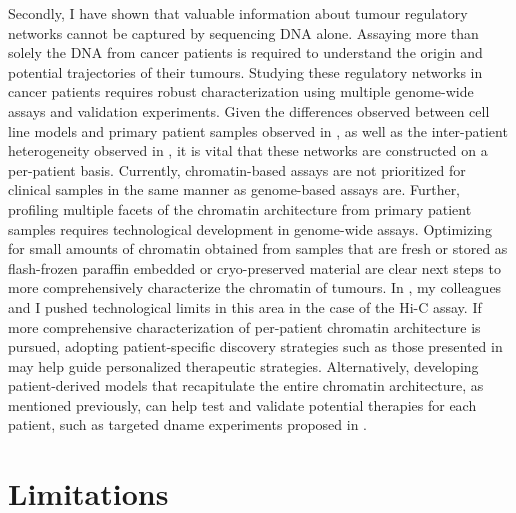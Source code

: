 Secondly, I have shown that valuable information about tumour regulatory networks cannot be captured by sequencing DNA alone.
Assaying more than solely the DNA from cancer patients is required to understand the origin and potential trajectories of their tumours.
Studying these regulatory networks in cancer patients requires robust characterization using multiple genome-wide assays and validation experiments.
Given the differences observed between cell line models and primary patient samples observed in , as well as the inter-patient heterogeneity observed in , it is vital that these networks are constructed on a per-patient basis.
Currently, chromatin-based assays are not prioritized for clinical samples in the same manner as genome-based assays are.
Further, profiling multiple facets of the chromatin architecture from primary patient samples requires technological development in genome-wide assays.
Optimizing for small amounts of chromatin obtained from samples that are fresh or stored as flash-frozen paraffin embedded or cryo-preserved material are clear next steps to more comprehensively characterize the chromatin of tumours.
In , my colleagues and I pushed technological limits in this area in the case of the Hi-C assay.
If more comprehensive characterization of per-patient chromatin architecture is pursued, adopting patient-specific discovery strategies such as those presented in  may help guide personalized therapeutic strategies.
Alternatively, developing patient-derived models that recapitulate the entire chromatin architecture, as mentioned previously, can help test and validate potential therapies for each patient, such as targeted \gls{dname} experiments proposed in .

\section{Limitations}

